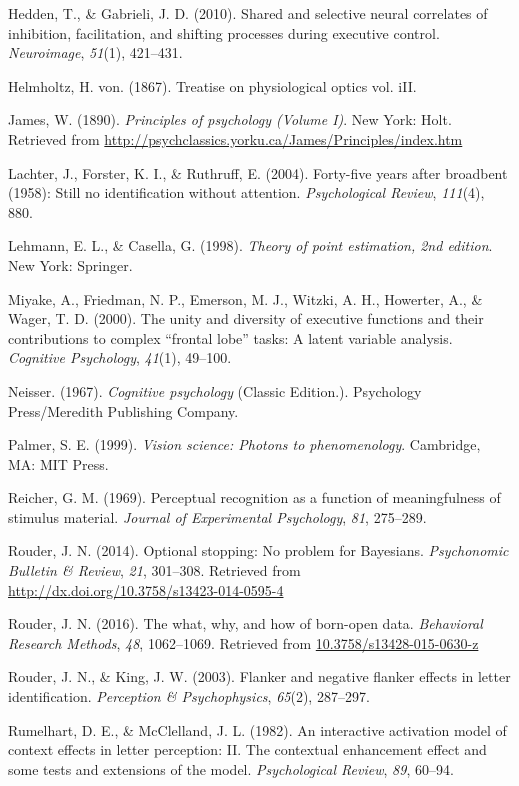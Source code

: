 \documentclass[english,floatsintext,man]{apa6}
\begin{document}
\hypertarget{ref-Hedden:Gabrieli:2010}{}
Hedden, T., \& Gabrieli, J. D. (2010). Shared and selective neural
correlates of inhibition, facilitation, and shifting processes during
executive control. \emph{Neuroimage}, \emph{51}(1), 421--431.

\hypertarget{ref-Helmholtz:1867}{}
Helmholtz, H. von. (1867). Treatise on physiological optics vol. iII.

\hypertarget{ref-James:1890a}{}
James, W. (1890). \emph{Principles of psychology (Volume I)}. New York:
Holt. Retrieved from
\url{http://psychclassics.yorku.ca/James/Principles/index.htm}

\hypertarget{ref-Lachter:etal:2004}{}
Lachter, J., Forster, K. I., \& Ruthruff, E. (2004). Forty-five years
after broadbent (1958): Still no identification without attention.
\emph{Psychological Review}, \emph{111}(4), 880.

\hypertarget{ref-Lehmann:Casella:1998}{}
Lehmann, E. L., \& Casella, G. (1998). \emph{Theory of point estimation,
2nd edition}. New York: Springer.

\hypertarget{ref-Miyake:etal:2000}{}
Miyake, A., Friedman, N. P., Emerson, M. J., Witzki, A. H., Howerter,
A., \& Wager, T. D. (2000). The unity and diversity of executive
functions and their contributions to complex ``frontal lobe'' tasks: A
latent variable analysis. \emph{Cognitive Psychology}, \emph{41}(1),
49--100.

\hypertarget{ref-Neisser:1967}{}
Neisser. (1967). \emph{Cognitive psychology} (Classic Edition.).
Psychology Press/Meredith Publishing Company.

\hypertarget{ref-Palmer:1999}{}
Palmer, S. E. (1999). \emph{Vision science: Photons to phenomenology}.
Cambridge, MA: MIT Press.

\hypertarget{ref-Reicher:1969}{}
Reicher, G. M. (1969). Perceptual recognition as a function of
meaningfulness of stimulus material. \emph{Journal of Experimental
Psychology}, \emph{81}, 275--289.

\hypertarget{ref-Rouder:2014}{}
Rouder, J. N. (2014). Optional stopping: No problem for Bayesians.
\emph{Psychonomic Bulletin \& Review}, \emph{21}, 301--308. Retrieved
from \url{http://dx.doi.org/10.3758/s13423-014-0595-4}

\hypertarget{ref-Rouder:2016}{}
Rouder, J. N. (2016). The what, why, and how of born-open data.
\emph{Behavioral Research Methods}, \emph{48}, 1062--1069. Retrieved
from \url{10.3758/s13428-015-0630-z}

\hypertarget{ref-Rouder:King:2003}{}
Rouder, J. N., \& King, J. W. (2003). Flanker and negative flanker
effects in letter identification. \emph{Perception \& Psychophysics},
\emph{65}(2), 287--297.

\hypertarget{ref-Rumelhart:McClelland:1982}{}
Rumelhart, D. E., \& McClelland, J. L. (1982). An interactive activation
model of context effects in letter perception: II. The contextual
enhancement effect and some tests and extensions of the model.
\emph{Psychological Review}, \emph{89}, 60--94.
\end{document}
